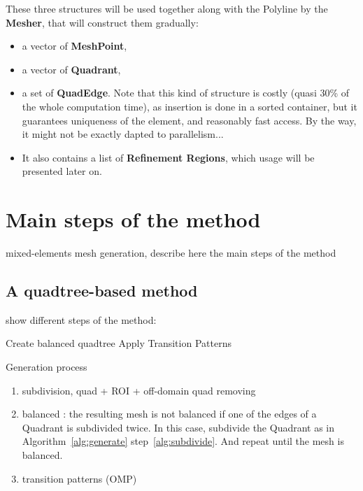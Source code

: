 \documentclass[10pt]{article}
\begin{document}
These three structures will be used together along with the Polyline by the \textbf{Mesher}, that will construct them gradually:
\begin{itemize}
\item a vector of \textbf{MeshPoint},
\item a vector of \textbf{Quadrant},
\item a set of \textbf{QuadEdge}. Note that this kind of structure is costly (quasi 30\% of the whole computation time), as insertion is done in a sorted container, but it guarantees uniqueness of the element, and reasonably fast access. By the way, it might not be exactly dapted to parallelism...
\item It also contains a list of \textbf{Refinement Regions}, which usage will be presented later on.
\end{itemize}

\section{Main steps of the method}
\label{sec:method}

mixed-elements mesh generation, describe here the main steps of the method

\subsection{A quadtree-based method}
show different steps of the method: 

\begin{algorithm}[H]
\SetAlgoLined
{}
 \nl {}
 \nl Create balanced quadtree\; \label{alg:goto}
 \nl Apply Transition Patterns\;
 \caption{Generation process}
 \label{alg:generate}
\end{algorithm}


\begin{enumerate}
\item subdivision, quad + ROI + off-domain quad removing
\item balanced : the resulting mesh is not balanced if one of the edges of a Quadrant is subdivided twice. In this case, subdivide the Quadrant as in Algorithm~\ref{alg:generate} step~\ref{alg:subdivide}. And repeat until the mesh is balanced.
\item transition patterns (OMP)
\end{enumerate}
\end{document}
